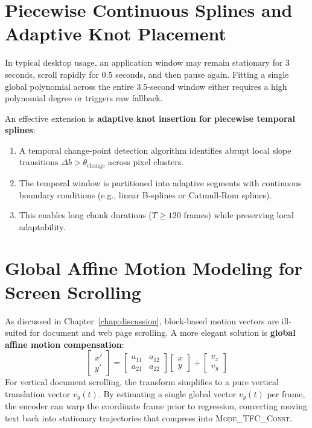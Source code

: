 \section{Piecewise Continuous Splines and Adaptive Knot Placement}
In typical desktop usage, an application window may remain stationary for 3 seconds, scroll rapidly for 0.5 seconds, and then pause again. Fitting a single global polynomial across the entire 3.5-second window either requires a high polynomial degree or triggers raw fallback.

An effective extension is \textbf{adaptive knot insertion for piecewise temporal splines}:
\begin{enumerate}
    \item A temporal change-point detection algorithm identifies abrupt local slope transitions $\Delta b > \theta_{\text{change}}$ across pixel clusters.
    \item The temporal window is partitioned into adaptive segments with continuous boundary conditions (e.g., linear B-splines or Catmull-Rom splines).
    \item This enables long chunk durations ($T \ge 120$ frames) while preserving local adaptability.
\end{enumerate}

\section{Global Affine Motion Modeling for Screen Scrolling}
As discussed in Chapter~\ref{chap:discussion}, block-based motion vectors are ill-suited for document and web page scrolling. A more elegant solution is \textbf{global affine motion compensation}:
\begin{equation}
    \begin{bmatrix}
        x' \\
        y'
    \end{bmatrix}
    =
    \begin{bmatrix}
        a_{11} & a_{12} \\
        a_{21} & a_{22}
    \end{bmatrix}
    \begin{bmatrix}
        x \\
        y
    \end{bmatrix}
    +
    \begin{bmatrix}
        v_x \\
        v_y
    \end{bmatrix}
\end{equation}
For vertical document scrolling, the transform simplifies to a pure vertical translation vector $v_y(t)$. By estimating a single global vector $v_y(t)$ per frame, the encoder can warp the coordinate frame prior to regression, converting moving text back into stationary trajectories that compress into \textsc{Mode\_TFC\_Const}.

